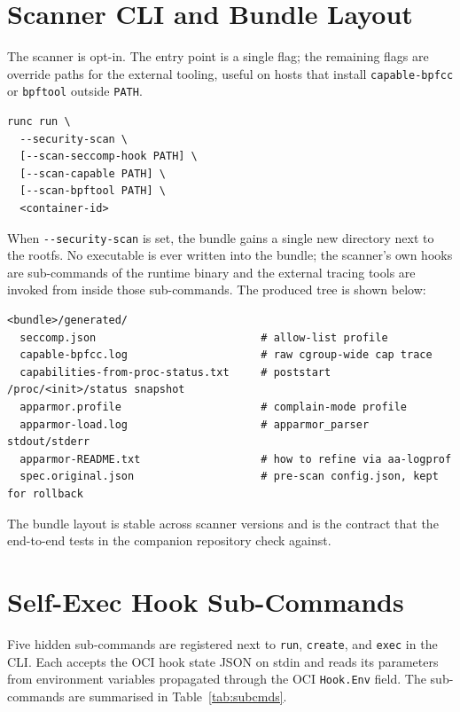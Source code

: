 \section{Scanner CLI and Bundle Layout}\label{sec:impl-flags}

The scanner is opt-in. The entry point is a single flag; the remaining flags are override paths for the external tooling, useful on hosts that install \texttt{capable-bpfcc} or \texttt{bpftool} outside \texttt{PATH}.

\begin{verbatim}
runc run \
  --security-scan \
  [--scan-seccomp-hook PATH] \
  [--scan-capable PATH] \
  [--scan-bpftool PATH] \
  <container-id>
\end{verbatim}

When \texttt{-{}-security-scan} is set, the bundle gains a single new directory next to the rootfs. No executable is ever written into the bundle; the scanner's own hooks are sub-commands of the runtime binary and the external tracing tools are invoked from inside those sub-commands. The produced tree is shown below:

\begin{verbatim}
<bundle>/generated/
  seccomp.json                          # allow-list profile
  capable-bpfcc.log                     # raw cgroup-wide cap trace
  capabilities-from-proc-status.txt     # poststart /proc/<init>/status snapshot
  apparmor.profile                      # complain-mode profile
  apparmor-load.log                     # apparmor_parser stdout/stderr
  apparmor-README.txt                   # how to refine via aa-logprof
  spec.original.json                    # pre-scan config.json, kept for rollback
\end{verbatim}

The bundle layout is stable across scanner versions and is the contract that the end-to-end tests in the companion repository check against.

\section{Self-Exec Hook Sub-Commands}\label{sec:impl-subcmd}

Five hidden sub-commands are registered next to \texttt{run}, \texttt{create}, and \texttt{exec} in the CLI. Each accepts the OCI hook state JSON on stdin and reads its parameters from environment variables propagated through the OCI \texttt{Hook.Env} field. The sub-commands are summarised in Table~\ref{tab:subcmds}.

